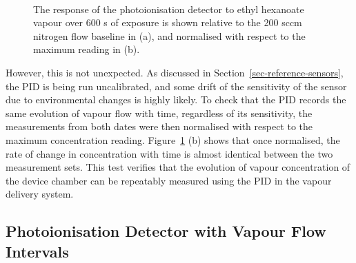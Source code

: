 \documentclass[
  a4paper,
]{scrbook}
\begin{document}
\begin{figure}
\begin{minipage}[t]{0.70\linewidth}
{{}

}

\end{minipage}%
%
\begin{minipage}[t]{0.15\linewidth}

{\centering 

~

}

\end{minipage}%

\caption[The response of the photoionisation detector to ethyl hexanoate
vapour relative to the 200 sccm nitrogen flow baseline over 600 s of
exposure, both unnormalised and normalised to the maximum
reading.]{\label{fig-PID-EtHex-response}The response of the
photoionisation detector to ethyl hexanoate vapour over 600 s of
exposure is shown relative to the 200 sccm nitrogen flow baseline in
(a), and normalised with respect to the maximum reading in (b).}

\end{figure}

However, this is not unexpected. As discussed in
Section~\ref{sec-reference-sensors}, the PID is being run uncalibrated,
and some drift of the sensitivity of the sensor due to environmental
changes is highly likely. To check that the PID records the same
evolution of vapour flow with time, regardless of its sensitivity, the
measurements from both dates were then normalised with respect to the
maximum concentration reading. Figure~\ref{fig-PID-EtHex-response} (b)
shows that once normalised, the rate of change in concentration with
time is almost identical between the two measurement sets. This test
verifies that the evolution of vapour concentration of the device
chamber can be repeatably measured using the PID in the vapour delivery
system.

\hypertarget{photoionisation-detector-with-vapour-flow-intervals}{%
\subsection{Photoionisation Detector with Vapour Flow
Intervals}\label{photoionisation-detector-with-vapour-flow-intervals}}
\end{document}
